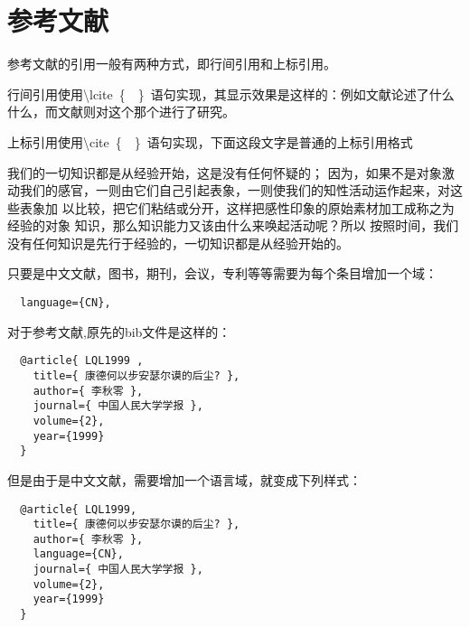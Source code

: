 
%
%
%

\chapter{参考文献}
\label{chap07}

参考文献的引用一般有两种方式，即行间引用和上标引用。

行间引用使用\textbackslash lcite~\{~~\}~语句实现，其显示效果是这样的：例如文献论述了什么什么，而文献则对这个那个进行了研究。

上标引用使用\textbackslash cite~\{~~\}~语句实现，下面这段文字是普通的上标引用格式

我们的一切知识都是从经验开始\cite{LQL1999}，这是没有任何怀疑的\cite{DXM2005}\cite{DXM2000}；
因为，如果不是对象激动我们的感官，一则由它们自己引起表象，一则使我们的知性活动运作起来，对这些表象加
以比较，把它们粘结或分开，\cite{OJP1999,OJP1991}这样把感性印象的原始素材加工成称之为经验的对象
知识，那么知识能力又该由什么来唤起活动呢？\cite{braun2007,kelton2002,strawderman2001,LQL1999}所以
按照时间，我们没有任何知识是先行于经验的，一切知识都是从经验开始的。

只要是中文文献，图书，期刊，会议，专利等等需要为每个条目增加一个域：
\begin{lstlisting}
  language={CN},
\end{lstlisting}

对于\cite{DXM2005}参考文献\cite{OJP1999},原先的bib文件是这样的：
\begin{lstlisting}
  @article{ LQL1999 ,
    title={ 康德何以步安瑟尔谟的后尘? },
    author={ 李秋零 },
    journal={ 中国人民大学学报 },
    volume={2},
    year={1999}
  }
\end{lstlisting}


但是由于是中文文献，需要增加一个语言域，就变成下列样式：
\begin{lstlisting}
  @article{ LQL1999,
    title={ 康德何以步安瑟尔谟的后尘? },
    author={ 李秋零 },
    language={CN},
    journal={ 中国人民大学学报 },
    volume={2},
    year={1999}
  }
\end{lstlisting}

